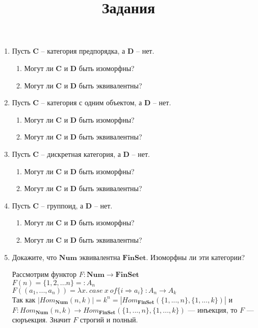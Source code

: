 \documentclass[draft]{article}
\newcommand{\cat}[1]{\mathbf{#1}}
\renewcommand{\C}{\cat{C}}
\newcommand{\D}{\cat{D}}
\newcommand{\FinSet}{\cat{FinSet}}
\newcommand{\Num}{\cat{Num}}
\begin{document}
\title{Задания}
\maketitle

\begin{enumerate}

\item Пусть $\C$ -- категория предпорядка, а $\D$ -- нет.
\begin{enumerate}
\item Могут ли $\C$ и $\D$ быть изоморфны?
\item Могут ли $\C$ и $\D$ быть эквивалентны?
\end{enumerate}

\item Пусть $\C$ -- категория с одним объектом, а $\D$ -- нет.
\begin{enumerate}
\item Могут ли $\C$ и $\D$ быть изоморфны?
\item Могут ли $\C$ и $\D$ быть эквивалентны?
\end{enumerate}

\item Пусть $\C$ -- дискретная категория, а $\D$ -- нет.
\begin{enumerate}
\item Могут ли $\C$ и $\D$ быть изоморфны?
\item Могут ли $\C$ и $\D$ быть эквивалентны?
\end{enumerate}

\item Пусть $\C$ -- группоид, а $\D$ -- нет.
\begin{enumerate}
\item Могут ли $\C$ и $\D$ быть изоморфны?
\item Могут ли $\C$ и $\D$ быть эквивалентны?
\end{enumerate}

\item Докажите, что $\Num$ эквивалентна $\FinSet$. Изоморфны ли эти категории?

Рассмотрим функтор
$ F : \Num \to \FinSet$\\
$F(n) = \{1, 2, ... n\} =: A_n$\\
$F((a_1, ..., a_n)) = \lambda x. ~case ~ x ~ of \{ i \Rightarrow a_i \} ~: A_n \to A_k$\\

Так как $|Hom_{\Num}(n, k)| = k^n = |Hom_\FinSet(\{1,...,n\}, \{1,...,k\})|$ и  $F: Hom_{\Num}(n, k) \to Hom_\FinSet(\{1,...,n\}, \{1,...,k\})$ --- инъекция, то $F$ --- сюръекция. Значит $F$ строгий и полный.\\


\end{enumerate}
\end{document}
